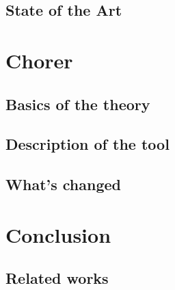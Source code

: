 \documentclass{article}
\theoremstyle{definition}
\theoremstyle{definition}
\begin{document}
\subsection{State of the Art}


\section{Chorer}


\subsection{Basics of the theory}


\subsection{Description of the tool}


\subsection{What's changed}


\section{Conclusion}


\subsection{Related works}


\newpage



\end{document}
